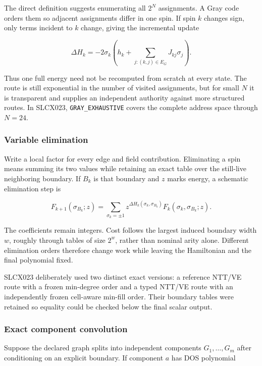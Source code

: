 The direct definition suggests enumerating all \(2^N\) assignments. A
Gray code orders them so adjacent assignments differ in one spin. If
spin \(k\) changes sign, only terms incident to \(k\) change, giving the
incremental update

\[
\Delta H_k
=-2\sigma_k\left(h_k+\sum_{j:(k,j)\in E_G}J_{kj}\sigma_j\right).
\]

Thus one full energy need not be recomputed from scratch at every state.
The route is still exponential in the number of visited assignments, but
for small \(N\) it is transparent and supplies an independent authority
against more structured routes. In SLCX023, \texttt{GRAY\_EXHAUSTIVE}
covers the complete address space through \(N=24\).

\subsubsection{Variable elimination}\label{viii-ch03-variable-elimination}

Write a local factor for every edge and field contribution. Eliminating
a spin means summing its two values while retaining an exact table over
the still-live neighboring boundary. If \(B_k\) is that boundary and
\(z\) marks energy, a schematic elimination step is

\[
F_{k+1}(\sigma_{B_k};z)
=\sum_{\sigma_k=\pm1}
 z^{\Delta H_k(\sigma_k,\sigma_{B_k})}
 F_k(\sigma_k,\sigma_{B_k};z).
\]

The coefficients remain integers. Cost follows the largest induced
boundary width \(w\), roughly through tables of size \(2^w\), rather
than nominal arity alone. Different elimination orders therefore change
work while leaving the Hamiltonian and the final polynomial fixed.

SLCX023 deliberately used two distinct exact versions: a reference
NTT/VE route with a frozen min-degree order and a typed NTT/VE route
with an independently frozen cell-aware min-fill order. Their boundary
tables were retained so equality could be checked below the final scalar
output.

\subsubsection{Exact component
convolution}\label{viii-ch03-exact-component-convolution}

Suppose the declared graph splits into independent components
\(G_1,\ldots,G_m\) after conditioning on an explicit boundary. If
component \(a\) has DOS polynomial

